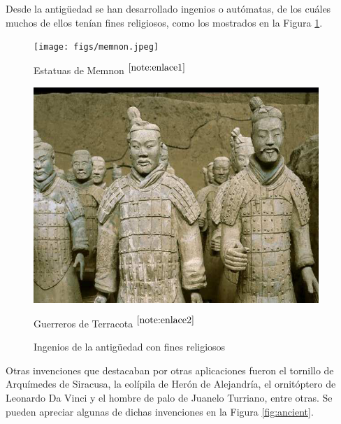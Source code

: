Desde la antigüedad se han desarrollado ingenios o autómatas, de los cuáles muchos de ellos tenían fines religiosos, como los mostrados en la Figura \ref{fig:ancientrel}.   \\


\begin{figure}[ht!]
	\centering
	\begin{minipage}{0.4\linewidth}
		\centering
		\texttt{[image: figs/memnon.jpeg]}
		\caption*{\centering Estatuas de Memnon $^{\ref{note:enlace1}}$} %
	\end{minipage}
	\hspace{2cm}
	\begin{minipage}{0.35\linewidth}
		\centering
		\includegraphics[width=\linewidth]{figs/terracota.png}
		\caption*{\centering Guerreros de Terracota $^{\ref{note:enlace2}}$} %
	\end{minipage}
	\caption{Ingenios de la antigüedad con fines religiosos}
	\label{fig:ancientrel}
\end{figure}


\setcounter{footnote}{1} %

\setcounter{footnote}{2} %
 
Otras invenciones que destacaban por otras aplicaciones fueron el tornillo de Arquímedes de Siracusa, la eolípila de Herón de Alejandría, el ornitóptero de Leonardo Da Vinci y el hombre de palo de Juanelo Turriano, entre otras. Se pueden apreciar algunas de dichas invenciones en la Figura \ref{fig:ancient}.\\

